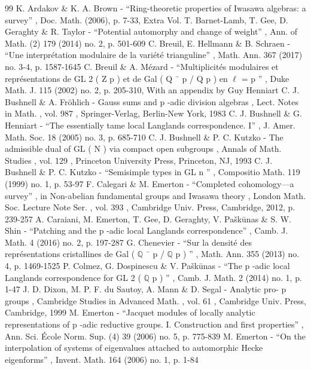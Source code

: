 \documentclass[11pt]{article}
\theoremstyle{definition}
\begin{document}
\begin{thebibliography}{99}
 K. Ardakov \& K. A. Brown - “Ring-theoretic properties of Iwasawa algebras: a survey” , Doc. Math. (2006), p. 7-33, Extra Vol.
 T. Barnet-Lamb, T. Gee, D. Geraghty \& R. Taylor - “Potential automorphy and change of weight” , Ann. of Math. (2) 179 (2014) no. 2, p. 501-609
 C. Breuil, E. Hellmann \& B. Schraen - “Une interprétation modulaire de la variété trianguline” , Math. Ann. 367 (2017) no. 3-4, p. 1587-1645
 C. Breuil \& A. Mézard - “Multiplicités modulaires et représentations de GL 2 ( Z p ) et de Gal ( Q ¯ p / Q p ) en \(\ell\) = p ” , Duke Math. J. 115 (2002) no. 2, p. 205-310, With an appendix by Guy Henniart
 C. J. Bushnell \& A. Fröhlich - Gauss sums and p -adic division algebras , Lect. Notes in Math. , vol. 987 , Springer-Verlag, Berlin-New York, 1983
 C. J. Bushnell \& G. Henniart - “The essentially tame local Langlands correspondence. I” , J. Amer. Math. Soc. 18 (2005) no. 3, p. 685-710
 C. J. Bushnell \& P. C. Kutzko - The admissible dual of GL ( N ) via compact open subgroups , Annals of Math. Studies , vol. 129 , Princeton University Press, Princeton, NJ, 1993
 C. J. Bushnell \& P. C. Kutzko - “Semisimple types in GL n ” , Compositio Math. 119 (1999) no. 1, p. 53-97
 F. Calegari \& M. Emerton - “Completed cohomology—a survey” , in Non-abelian fundamental groups and Iwasawa theory , London Math. Soc. Lecture Note Ser. , vol. 393 , Cambridge Univ. Press, Cambridge, 2012, p. 239-257
 A. Caraiani, M. Emerton, T. Gee, D. Geraghty, V. Paškūnas \& S. W. Shin - “Patching and the p -adic local Langlands correspondence” , Camb. J. Math. 4 (2016) no. 2, p. 197-287
 G. Chenevier - “Sur la densité des représentations cristallines de Gal ( \(\mathbb Q\) ¯ p / \(\mathbb Q\) p ) ” , Math. Ann. 355 (2013) no. 4, p. 1469-1525
 P. Colmez, G. Dospinescu \& V. Paškūnas - “The p -adic local Langlands correspondence for GL 2 ( \(\mathbb Q\) p ) ” , Camb. J. Math. 2 (2014) no. 1, p. 1-47
 J. D. Dixon, M. P. F. du Sautoy, A. Mann \& D. Segal - Analytic pro- p groups , Cambridge Studies in Advanced Math. , vol. 61 , Cambridge Univ. Press, Cambridge, 1999
 M. Emerton - “Jacquet modules of locally analytic representations of p -adic reductive groups. I. Construction and first properties” , Ann. Sci. École Norm. Sup. (4) 39 (2006) no. 5, p. 775-839
 M. Emerton - “On the interpolation of systems of eigenvalues attached to automorphic Hecke eigenforms” , Invent. Math. 164 (2006) no. 1, p. 1-84

\end{thebibliography}
\end{document}
